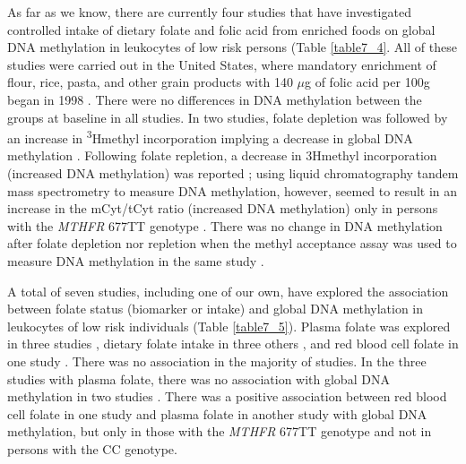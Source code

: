 \noindent As far as we know, there are currently four studies that have investigated controlled intake of dietary folate and folic acid from enriched foods on global DNA methylation in leukocytes of low risk persons (Table \ref{table7_4}. All of these studies were carried out in the United States, where mandatory enrichment of flour, rice, pasta, and other grain products with 140 $\mu$g of folic acid per 100g began in 1998 \cite{c72}. There were no differences in DNA methylation between the groups at baseline in all studies. In two studies, folate depletion was followed by an increase in \textsuperscript{3}Hmethyl incorporation implying a decrease in global DNA methylation \cite{c73,c74}. Following folate repletion, a decrease in 3Hmethyl incorporation (increased DNA methylation) was reported \cite{c73}; using liquid chromatography tandem mass spectrometry to measure DNA methylation, however, seemed to result in an increase in the mCyt/tCyt ratio (increased DNA methylation) only in persons with the \emph{
MTHFR} 677TT genotype \cite{c75}. There was no change in DNA methylation after folate depletion nor repletion when the methyl acceptance assay was used to measure DNA methylation in the same study \cite{c75}. 
 
\noindent A total of seven studies, including one of our own, have explored the association between folate status (biomarker or intake) and global DNA methylation in leukocytes of low risk individuals (Table \ref{table7_5}). Plasma folate was explored in three studies \cite{c76,c77,c78}, dietary folate intake in three others \cite{c79,c710,c711}, and red blood cell folate in one study \cite{c712}. There was no association in the majority of studies. In the three studies with plasma folate, there was no association with global DNA methylation in two studies \cite{c77,c78}. There was a positive association between red blood cell folate \cite{c712} in one study and plasma folate \cite{c76} in another study with global DNA methylation, but only in those with the \emph{MTHFR} 677TT genotype and not in persons with the CC genotype. 
 
